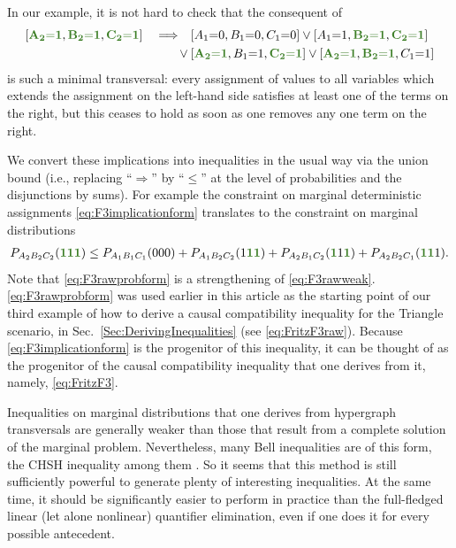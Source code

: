 In our example, it is not hard to check that the consequent of
\begin{align}\begin{split}\label{eq:F3implicationform}
	\bracks{\mgreen{A_2 \eql 1}, \mgreen{B_2 \eql 1}, \mgreen{C_2 \eql 1}} \quad\Longrightarrow\quad &\bracks{A_1 \eql 0, B_1 \eql 0, C_1 \eql 0} \lor \bracks{A_1 \eql 1, \mgreen{B_2 \eql 1}, \mgreen{C_2 \eql 1}} \\
	\lor\: & \bracks{\mgreen{A_2 \eql 1}, B_1 \eql 1, \mgreen{C_2 \eql 1}} \lor \bracks{\mgreen{A_2 \eql 1}, \mgreen{B_2 \eql 1}, C_1 \eql 1}
\end{split}\end{align}
is such a minimal transversal: every assignment of values to all variables which extends the assignment on the left-hand side satisfies at least one of the terms on the right, but this ceases to hold as soon as one removes any one term on the right. 

We convert these implications into inequalities in the usual way via the union bound (i.e., replacing ``$\Rightarrow$'' by ``$\leq$'' at the level of probabilities and the disjunctions by sums). For example the constraint on marginal deterministic assignments \cref{eq:F3implicationform} translates to the constraint on marginal distributions
\begin{align}\label{eq:F3rawprobform}
    P_{A_2 B_2 C_2}\parens{\mgreen{1} \mgreen{1} \mgreen{1}} \leq P_{A_1 B_1 C_1}\parens{0 0 0}+P_{A_1 B_2 C_2}\parens{1 \mgreen{1 1}}+P_{A_2 B_1 C_2}\parens{\mgreen{1} 1 \mgreen{1}}+P_{A_2 B_2 C_1}\parens{\mgreen{1 1} 1}.
\end{align}
Note that \cref{eq:F3rawprobform} is a strengthening of \cref{eq:F3rawweak}.  \cref{eq:F3rawprobform} was used earlier in this article as the starting point of our third example of how to derive a causal compatibility inequality for the Triangle scenario, in Sec.~\ref{Sec:DerivingInequalities} (see \cref{eq:FritzF3raw}). Because \cref{eq:F3implicationform} is the progenitor of this inequality, it can be thought of as the progenitor of the causal compatibility inequality that one derives from it, namely, \cref{eq:FritzF3}.  


Inequalities on marginal distributions that one derives from hypergraph transversals are generally weaker than those that result from a complete solution of the marginal problem. Nevertheless, many Bell inequalities are of this form, the CHSH inequality among them \cite{Ghirardi08}.  So it seems that this method is still sufficiently powerful to generate plenty of interesting inequalities. At the same time, it should be significantly easier to perform in practice than the full-fledged linear (let alone nonlinear) quantifier elimination, even if one does it for every possible antecedent.

